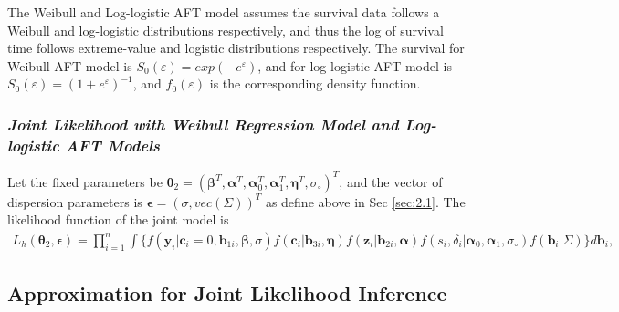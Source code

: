The Weibull and Log-logistic AFT model assumes the survival data follows a Weibull and log-logistic distributions respectively, and thus the log of survival time follows extreme-value and logistic distributions respectively. The survival for Weibull AFT model is $S_0(\varepsilon)=exp(-e^{\varepsilon})$, and for log-logistic AFT model is $S_0(\varepsilon)=(1+e^{\varepsilon})^{-1}$, and $f_0(\varepsilon)$ is the corresponding density function.

\subsubsection*{\textit{Joint Likelihood with Weibull Regression Model and Log-logistic AFT Models}}

Let the fixed parameters be $\boldsymbol{\theta}_2 = (\boldsymbol{\beta}^T,\boldsymbol{\alpha}^T,\boldsymbol{\alpha}_0^T, \boldsymbol{\alpha}_1^T, \boldsymbol{\eta}^T, \sigma_{\circ})^T$, and the vector of dispersion parameters is $\boldsymbol{\epsilon}=(\sigma, vec({\Sigma}))^T$ as define above in Sec \ref{sec:2.1}. 
The likelihood function of the joint model is
\begin{equation}
    \begin{split}
        L_{h}(\boldsymbol{\theta}_2,\boldsymbol{\epsilon}) = \prod_{i=1}^n \int\{ f(\boldsymbol{y}_{i}|\boldsymbol{c}_{i}=0,\boldsymbol{b}_{1i},\boldsymbol{\beta},\sigma) f(\boldsymbol{c}_{i}|\boldsymbol{b}_{3i},\boldsymbol{\eta}) f(\boldsymbol{z}_{i}|\boldsymbol{b}_{2i},\boldsymbol{\alpha}) f(s_i,\delta_i|\boldsymbol{\alpha}_0,\boldsymbol{\alpha}_1,\sigma_{\circ}) f(\boldsymbol{b}_i|\Sigma)\} d \boldsymbol{b}_i,
    \end{split}
\end{equation}



\subsection{Approximation for Joint Likelihood Inference}


